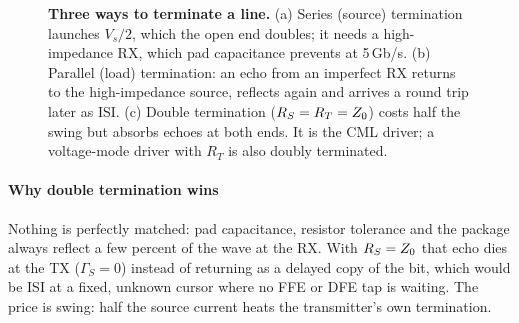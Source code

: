 \begin{figure}[tbp]
\centering
{}
\caption{\textbf{Three ways to terminate a line.} (a) Series (source) termination launches $V_s/2$, which the open end doubles; it needs a high-impedance RX, which pad capacitance prevents at 5\,Gb/s. (b) Parallel (load) termination: an echo from an imperfect RX returns to the high-impedance source, reflects again and arrives a round trip later as ISI. (c) Double termination ($R_S=R_T=Z_0$) costs half the swing but absorbs echoes at both ends. It is the \OS{} CML driver; a voltage-mode driver with $R_T$ is also doubly terminated.}
\label{fig:ch9-term}
\end{figure}

\paragraph{Why double termination wins} Nothing is perfectly matched: pad capacitance, resistor tolerance and the package always reflect a few percent of the wave at the RX. With $R_S=Z_0$ that echo dies at the TX ($\Gamma_S=0$) instead of returning as a delayed copy of the bit, which would be ISI at a fixed, unknown cursor where no FFE or DFE tap is waiting. The price is swing: half the source current heats the transmitter's own termination.

